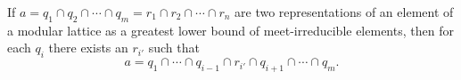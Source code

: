 If $a = q_1 \cap q_2 \cap \cdots \cap q_m = r_1 \cap r_2 \cap \cdots \cap r_n$ are two representations of an element of a modular lattice as a greatest lower bound of meet-irreducible elements, then for each $q_i$ there exists an $r_{i'}$ such that
$$a = q_1 \cap \cdots \cap q_{i-1} \cap r_{i'} \cap q_{i+1} \cap \cdots \cap q_m.$$
